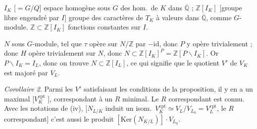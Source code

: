 \documentclass[11pt,a4paper]{article}
\begin{document}
$I_{K}$ [$= G/Q$] espace homogène sous $G$ des hom.\ de $K$ dans
$\overline{\mathbb{Q}}$ ; $\mathbb{Z}[I_{K}]$ [groupe libre engendré par
$I$] groupe des caractères de $T_{K}$ à valeurs dans $\overline{\mathbb{Q}}$,
comme $G$-module. 
$\mathbb{Z} \subset \mathbb{Z}[I_{K}]$ fonctions constantes sur $I$.


$N$ sous $G$-module, tel que $\tau$ opère sur $N/\mathbb{Z}$ par
$-\mathrm{id}$, donc $P$ y opère trivialement ; donc $H$ opère trivialement
sur $N$, donc $N \subset \mathbb{Z}[I_{K}]^{P} = \mathbb{Z}[P \backslash
I_{K}]$. \struck{\ill{}} Or $P \backslash I_{K} = I_{L}$, donc on trouve $N
\subset \mathbb{Z}[I_{L}]$, ce qui signifie que le quotient $V'$ de $V_{K}$
est majoré par $V_{L}$.




\emph{Corollaire 2}. Parmi les $V'$ satisfaisant les conditions de la
proposition, il y en a un maximal [$V_{K}^{\mathrm{cpt}}$
], correspondant à un $R$ minimal. Le $R$
correspondant est connu. Avec les notations de (iv), [$N_{L/K}$ induit un
isom.\ $V_{K}^{\mathrm{cpt}} \simeq V_{L}/V_{L_{0}} = V_{L}^{\mathrm{cpt}}$,
le $R$ correspondant] c'est aussi le produit
$[\mathrm{Ker}(N_{K/L})] \cdot V_{L_{0}}$. 
\end{document}
